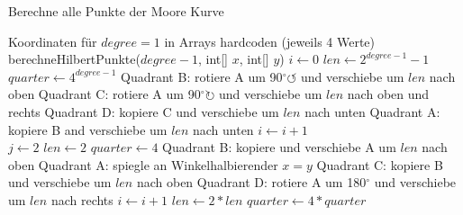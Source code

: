 \documentclass[course=erap]{aspdoc}
\begin{document}
\begin{algorithm}[h]
\scriptsize
\begin{algorithmic}
\caption{Berechne alle Punkte der Moore Kurve}
\label{moore:batch}
\State Koordinaten für $degree =1$ in Arrays hardcoden (jeweils 4 Werte)
	\Return
\EndIf	
\State berechneHilbertPunkte($degree - 1$, int[] $x$, int[] $y$)
\State $i \leftarrow 0$
\State $len \leftarrow 2^{degree - 1} -1$ 
\State $quarter \leftarrow 4^{degree-1}$
\State Quadrant B: rotiere A um 90$^{\circ}\circlearrowleft$ und verschiebe um $len$ nach oben
\State Quadrant C: rotiere A um 90$^{\circ}\circlearrowright$ und verschiebe um $len$ nach oben und rechts
\State Quadrant D: kopiere C und verschiebe um $len$ nach unten
\State Quadrant A: kopiere B and verschiebe um $len$ nach unten
\State $i \leftarrow i+1$
\EndWhile
\EndFunction
\ \\
\State $j \leftarrow 2$
\State $len \leftarrow 2$ 
\State $quarter \leftarrow 4$
	\State Quadrant B: kopiere und verschiebe A um $len$ nach oben
	\State Quadrant A: spiegle an Winkelhalbierender $x=y$
	\State Quadrant C: kopiere B und verschiebe um $len$ nach oben
	\State Quadrant D: rotiere A  um 180$^{\circ}$ und verschiebe um $len$ nach rechts
\EndWhile
\State $i \leftarrow i+1$
\State $len \leftarrow 2*len$
\State $quarter \leftarrow 4*quarter$
\EndWhile
\EndFunction
\end{algorithmic}
\end{algorithm}



\nocite{intel2017man}

{}
\end{document}
